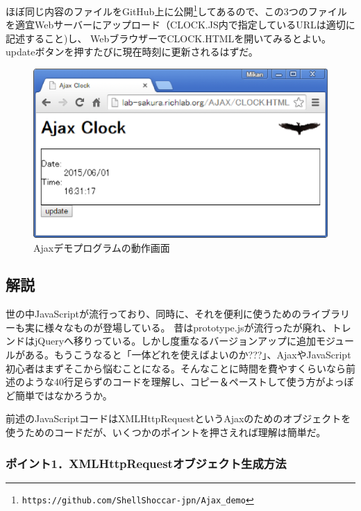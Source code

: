 ほぼ同じ内容のファイルをGitHub上に公開\footnote{\verb|https://github.com/ShellShoccar-jpn/Ajax_demo|}してあるので、この3つのファイルを適宜Webサーバーにアップロード（CLOCK.JS内で指定しているURLは適切に記述すること)し、
WebブラウザーでCLOCK.HTMLを開いてみるとよい。updateボタンを押すたびに現在時刻に更新されるはずだ。
\begin{figure}[H]
	\begin{center}
		\includegraphics*[scale=0.50]{tex/4_web/figs/Ajax_demo.eps}
		\vspace{-2mm}
		\caption{Ajaxデモプログラムの動作画面}
		\label{fig:Ajax_demo}
		\vspace{-5mm}
	\end{center}
\end{figure}

\subsection*{解説}

世の中JavaScriptが流行っており、同時に、それを便利に使うためのライブラリーも実に様々なものが登場している。
昔はprototype.jsが流行ったが廃れ、トレンドはjQueryへ移りっている。しかし度重なるバージョンアップに追加モジュールがある。もうこうなると「一体どれを使えばよいのか???」、AjaxやJavaScript初心者はまずそこから悩むことになる。そんなことに時間を費やすくらいなら前述のような40行足らずのコードを理解し、コピー＆ペーストして使う方がよっぽど簡単ではなかろうか。

前述のJavaScriptコードはXMLHttpRequestというAjaxのためのオブジェクトを使うためのコードだが、いくつかのポイントを押さえれば理解は簡単だ。

\subsubsection*{ポイント1．XMLHttpRequestオブジェクト生成方法}

